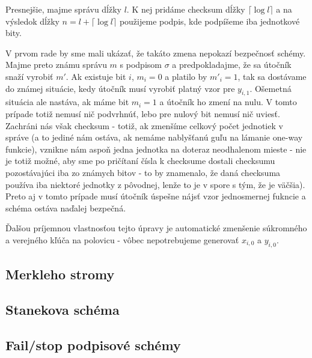Presnejšie, majme správu dĺžky $l$. K nej pridáme checksum dĺžky
$\lceil \log l \rceil$ a na výsledok dĺžky $n=l+\lceil \log l \rceil$
použijeme podpis, kde podpíšeme iba jednotkové bity.

V prvom rade by sme mali ukázať, že takáto zmena nepokazí bezpečnosť
schémy. Majme preto známu správu $m$ s podpisom $\sigma$ a
predpokladajme, že sa útočník snaží vyrobiť $m'$.
Ak existuje bit $i$, $m_i=0$ a platilo by $m'_i=1$, tak sa dostávame
do známej situácie, kedy útočník musí vyrobiť platný vzor pre $y_{i,1}$.
Ošemetná situácia ale nastáva, ak máme bit $m_i=1$ a útočník ho zmení
na nulu. V tomto prípade totiž nemusí nič podvrhnúť, lebo pre nulový
bit nemusí nič uviesť. Zachráni nás však checksum - totiž, ak zmenšíme
celkový počet jednotiek v správe (a to jediné nám ostáva, ak nemáme
nablyšťanú guľu na lámanie one-way funkcie), vznikne nám aspoň jedna
jednotka na doteraz neodhalenom mieste - nie je totiž možné, aby sme
po pričítaní čísla k checksume dostali checksumu pozostávajúci iba zo
známych bitov - to by znamenalo, že daná checksuma používa iba
niektoré jednotky z pôvodnej, lenže to je v spore s tým, že je
väčšia). Preto aj v tomto prípade musí útočník úspešne nájsť vzor
jednosmernej fukncie a schéma ostáva naďalej bezpečná.

Ďalšou príjemnou vlastnosťou tejto úpravy je automatické zmenšenie
súkromného a verejného kľúča na polovicu - vôbec nepotrebujeme
generovať $x_{i,0}$ a $y_{i,0}$.

\subsection{Merkleho stromy}
\subsection{Stanekova schéma}
\subsection{Fail/stop podpisové schémy}
